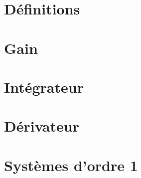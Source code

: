 \documentclass[10pt,fleqn]{article} %
\begin{document}

\vspace{2cm}
\pagestyle{fancy}
\thispagestyle{plain}

\section{Définitions}
\section{Gain}
\section{Intégrateur}
\section{Dérivateur}
\section{Systèmes d'ordre 1}
\end{document}
